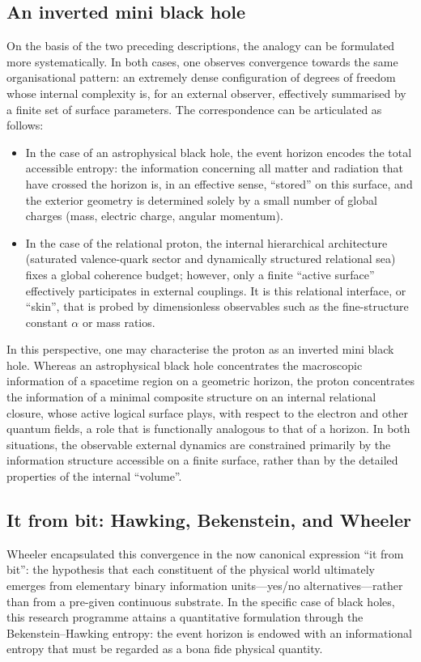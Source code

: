 \documentclass[11pt,a4paper]{article}
\begin{document}
\subsection{An inverted mini black hole}

On the basis of the two preceding descriptions, the analogy can be formulated more systematically. In both cases, one observes convergence towards the same organisational pattern: an extremely dense configuration of degrees of freedom whose internal complexity is, for an external observer, effectively summarised by a finite set of surface parameters. The correspondence can be articulated as follows:
\begin{itemize}[label=-]
    \item In the case of an astrophysical black hole, the event horizon encodes the total accessible entropy: the information concerning all matter and radiation that have crossed the horizon is, in an effective sense, “stored” on this surface, and the exterior geometry is determined solely by a small number of global charges (mass, electric charge, angular momentum).
    \item In the case of the relational proton, the internal hierarchical architecture (saturated valence-quark sector and dynamically structured relational sea) fixes a global coherence budget; however, only a finite “active surface” effectively participates in external couplings. It is this relational interface, or “skin”, that is probed by dimensionless observables such as the fine-structure constant \(\alpha\) or mass ratios.
\end{itemize}

In this perspective, one may characterise the proton as an inverted mini black hole. Whereas an astrophysical black hole concentrates the macroscopic information of a spacetime region on a geometric horizon, the proton concentrates the information of a minimal composite structure on an internal relational closure, whose active logical surface plays, with respect to the electron and other quantum fields, a role that is functionally analogous to that of a horizon. In both situations, the observable external dynamics are constrained primarily by the information structure accessible on a finite surface, rather than by the detailed properties of the internal “volume”.

\subsection{It from bit: Hawking, Bekenstein, and Wheeler}
Wheeler encapsulated this convergence in the now canonical expression “it from bit”: the hypothesis that each constituent of the physical world ultimately emerges from elementary binary information units—yes/no alternatives—rather than from a pre-given continuous substrate. In the specific case of black holes, this research programme attains a quantitative formulation through the Bekenstein–Hawking entropy: the event horizon is endowed with an informational entropy that must be regarded as a bona fide physical quantity.
\end{document}
